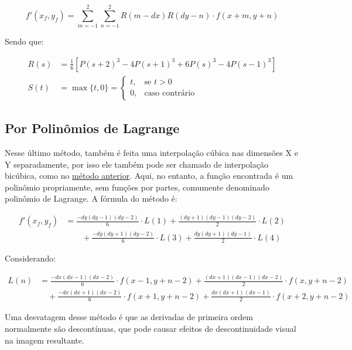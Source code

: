 \[
    f'(x_f, y_f) = \sum_{m = -1}^2 \sum_{n = -1}^2 R(m - dx) R(dy - n) \cdot f(x + m, y + n)
\]

Sendo que:

\begin{align*}
    R(s) &= \frac{1}{6} \left[P(s + 2)^3 - 4 P(s+1)^3 + 6 P(s)^3 - 4 P(s-1)^3\right] \\
    S(t) &= \max\{t, 0\} = \begin{cases}
        t, & \text{se } t > 0 \\
        0, & \text{caso contrário}
    \end{cases}
\end{align*}

\subsection{Por Polinômios de Lagrange} \label{sec:interp:lagrange}

Nesse último método, também é feita uma interpolação cúbica nas dimensões X e Y separadamente, por isso ele também pode ser chamado de interpolação bicúbica, como no \hyperref[sec:interp:bicubica]{método anterior}. Aqui, no entanto, a função encontrada é um polinômio propriamente, sem funções por partes, comumente denominado polinômio de Lagrange. A fórmula do método é:

\begin{align*}
    f'(x_f, y_f) &= \frac{-dy (dy - 1) (dy - 2)}{6} \cdot L(1) + \frac{(dy + 1) (dy - 1) (dy - 2)}{2} \cdot L(2) \\
    &\qquad + \frac{-dy (dy + 1) (dy - 2)}{6} \cdot L(3) + \frac{dy (dy + 1) (dy - 1)}{2} \cdot L(4)
\end{align*}

Considerando:

\begin{align*}
    L(n) &= \frac{-dx (dx - 1) (dx - 2)}{6} \cdot f(x - 1, y + n - 2) + \frac{(dx + 1) (dx - 1) (dx - 2)}{2} \cdot f(x, y + n - 2) \\
    &\quad + \frac{-dx (dx + 1) (dx - 2)}{6} \cdot f(x + 1, y + n - 2) + \frac{dx (dx + 1) (dx - 1)}{2} \cdot f(x + 2, y + n - 2)
\end{align*}

Uma desvatagem desse método é que as derivadas de primeira ordem normalmente são descontínuas, que pode causar efeitos de descontinuidade visual na imagem resultante.
